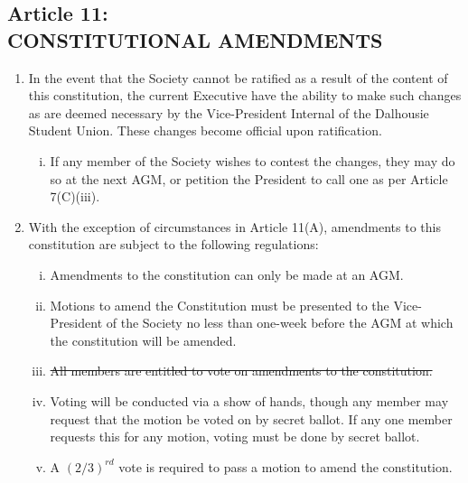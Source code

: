 \documentclass[]{report}
\begin{document}
\clearpage
\begin{center}
	\section*{Article 11:\\CONSTITUTIONAL AMENDMENTS}
	\vspace{12px}
\end{center}
\label{amendments}

	\renewcommand{\theenumi}{\Alph{enumi}}
	\begin{enumerate}
	
		\item In the event that the Society cannot be ratified as a result of the content of this constitution, the current Executive have the ability to make such changes as are deemed necessary by the Vice-President Internal of the Dalhousie Student Union. These changes become official upon ratification.
			\begin{enumerate}[i.]
				\item If any member of the Society wishes to contest the changes, they may do so at the next AGM, or petition the President to call one as per Article 7(C)(iii).
			\end{enumerate}
		
		\item With the exception of circumstances in Article 11(A), amendments to this constitution are subject to the following regulations:
			\begin{enumerate}[i.]
				\item Amendments to the constitution can only be made at an AGM.
				\item Motions to amend the Constitution must be presented \color{red}{by interested members of the general membership} \color{black} to the Vice-President \color{red}{Internal} \color{black} of the Society no less than one-week before the AGM at which the constitution will be amended.
				\item \st{All members are entitled to vote on amendments to the constitution.}\\
				\color{red}{All members of the general membership are entitled to vote on amendments to the constitution.}\color{black}
				\item Voting will be conducted via a show of hands, though any member may request that the motion be voted on by secret ballot. If any one member requests this for any motion, voting must be done by secret ballot.
				\item A $ (2/3)^{rd} $ vote \color{red}{of those present and voting} \color{black} is required to pass a motion to amend the constitution.
			\end{enumerate}
	
	\end{enumerate}
\end{document}
